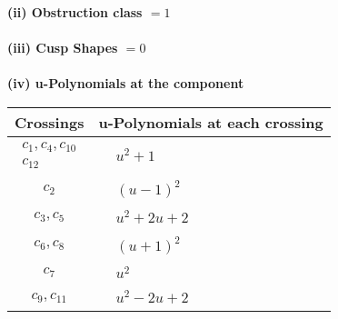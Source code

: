 \documentclass[1p]{elsarticle_modified}
\theoremstyle{definition}
\begin{document}
\flushleft \textbf{(ii) Obstruction class $= 1$}\\~\\
\flushleft \textbf{(iii) Cusp Shapes $= 0$}\\~\\
\newpage\renewcommand{\arraystretch}{1}
\flushleft \textbf{(iv) u-Polynomials at the component}\newline \\
\begin{tabular}{m{50pt}|m{274pt}}
Crossings & \hspace{64pt}u-Polynomials at each crossing \\
\hline $$\begin{aligned}c_{1},c_{4},c_{10}\\c_{12}\end{aligned}$$&$\begin{aligned}
&u^2+1
\end{aligned}$\\
\hline $$\begin{aligned}c_{2}\end{aligned}$$&$\begin{aligned}
&(u-1)^2
\end{aligned}$\\
\hline $$\begin{aligned}c_{3},c_{5}\end{aligned}$$&$\begin{aligned}
&u^2+2 u+2
\end{aligned}$\\
\hline $$\begin{aligned}c_{6},c_{8}\end{aligned}$$&$\begin{aligned}
&(u+1)^2
\end{aligned}$\\
\hline $$\begin{aligned}c_{7}\end{aligned}$$&$\begin{aligned}
&u^2
\end{aligned}$\\
\hline $$\begin{aligned}c_{9},c_{11}\end{aligned}$$&$\begin{aligned}
&u^2-2 u+2
\end{aligned}$\\
\hline
\end{tabular}\\~\\
\end{document}
